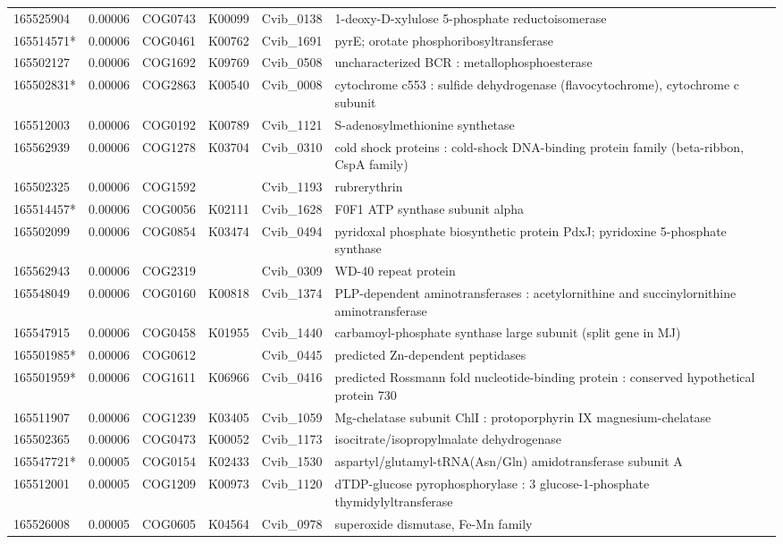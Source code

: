 \begin{landscape}
\begin{longtable}{p{1.6cm}p{1.2cm}p{1.5cm}p{1.5cm}p{2.8cm}p{13.5cm}}
165525904&0.00006&COG0743&K00099&Cvib\_0138&1-deoxy-D-xylulose 5-phosphate reductoisomerase \\
165514571*&0.00006&COG0461&K00762&Cvib\_1691&pyrE; orotate phosphoribosyltransferase \\
165502127&0.00006&COG1692&K09769&Cvib\_0508&uncharacterized BCR : metallophosphoesterase \\
165502831*&0.00006&COG2863&K00540&Cvib\_0008&cytochrome c553 : sulfide dehydrogenase (flavocytochrome), cytochrome c subunit \\
165512003&0.00006&COG0192&K00789&Cvib\_1121&S-adenosylmethionine synthetase \\
165562939&0.00006&COG1278&K03704&Cvib\_0310&cold shock proteins : cold-shock DNA-binding protein family (beta-ribbon, CspA family) \\
165502325&0.00006&COG1592&&Cvib\_1193&rubrerythrin \\
165514457*&0.00006&COG0056&K02111&Cvib\_1628&F0F1 ATP synthase subunit alpha \\
165502099&0.00006&COG0854&K03474&Cvib\_0494&pyridoxal phosphate biosynthetic protein PdxJ; pyridoxine 5-phosphate synthase \\
165562943&0.00006&COG2319&&Cvib\_0309&WD-40 repeat protein \\
165548049&0.00006&COG0160&K00818&Cvib\_1374&PLP-dependent aminotransferases : acetylornithine and succinylornithine aminotransferase \\
165547915&0.00006&COG0458&K01955&Cvib\_1440&carbamoyl-phosphate synthase large subunit (split gene in MJ) \\
165501985*&0.00006&COG0612&&Cvib\_0445&predicted Zn-dependent peptidases \\
165501959*&0.00006&COG1611&K06966&Cvib\_0416&predicted Rossmann fold nucleotide-binding protein : conserved hypothetical protein 730 \\
165511907&0.00006&COG1239&K03405&Cvib\_1059&Mg-chelatase subunit ChlI : protoporphyrin IX magnesium-chelatase \\
165502365&0.00006&COG0473&K00052&Cvib\_1173&isocitrate/isopropylmalate dehydrogenase \\
165547721*&0.00005&COG0154&K02433&Cvib\_1530&aspartyl/glutamyl-tRNA(Asn/Gln) amidotransferase subunit A \\
165512001&0.00005&COG1209&K00973&Cvib\_1120&dTDP-glucose pyrophosphorylase : 3 glucose-1-phosphate thymidylyltransferase \\
165526008&0.00005&COG0605&K04564&Cvib\_0978&superoxide dismutase, Fe-Mn family \\

\end{longtable}
\end{landscape}
